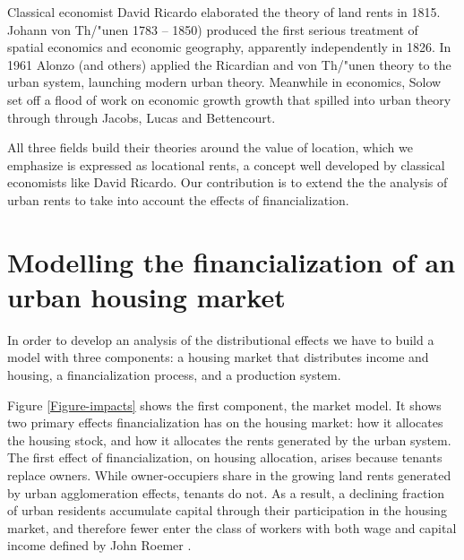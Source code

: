 Classical economist David Ricardo  elaborated the theory of land rents in 1815. Johann von Th/"unen 1783 -- 1850) produced the first serious treatment of spatial economics and economic geography, apparently independently in 1826. In 1961 Alonzo (and others) applied the  Ricardian and von Th/"unen theory to the urban system, launching modern urban theory. Meanwhile in economics, Solow set off a flood of work on  economic growth growth that  spilled into urban theory through through Jacobs, Lucas and Bettencourt. 

All three fields build their theories around  the value of location, which we emphasize is expressed as locational rents, a concept well developed by classical economists like David Ricardo. Our contribution is to extend the the analysis of urban rents to take into account the effects of financialization.


\section{Modelling the financialization of an urban housing market}
In order to develop an analysis of the distributional effects we have to build a model with three components: a housing market that distributes income and housing, a financialization process, and a production system. 

Figure \ref{Figure-impacts}  shows the first component, the market model.
It shows two primary effects financialization has on the housing market: how it allocates %
the housing stock, and how it allocates the \glspl{rent} generated by the urban system. %
The first effect of financialization, on housing allocation, arises because tenants replace owners. While owner-occupiers share in the growing land rents generated by urban agglomeration effects, tenants do not. As a result, a declining fraction of urban residents accumulate capital through their participation in the housing market, and therefore fewer enter the class of workers with both wage and capital income defined by John Roemer \cite{roemerGeneralTheoryExploitation1982}. 

